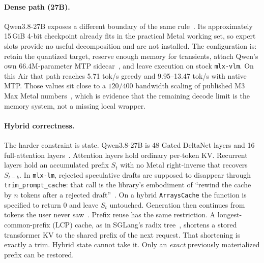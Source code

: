 \documentclass[11pt]{article}
\theoremstyle{definition}
\newcommand{\gdn}{Gated DeltaNet}
\begin{document}
\paragraph{Dense path (27B).}
Qwen3.8-27B exposes a different boundary of the same rule~\citep{qwen38card}. Its approximately 15\,GiB 4-bit checkpoint already fits in the practical Metal working set, so expert slots provide no useful decomposition and are not installed. The configuration is: retain the quantized target, reserve enough memory for transients, attach Qwen’s own 66.4M-parameter MTP sidecar~\citep{qwen3,mlxlm990}, and leave execution on stock \texttt{mlx-vlm}. On this Air that path reaches 5.71 tok/s greedy and 9.95--13.47 tok/s with native MTP. Those values sit close to a $120/400$ bandwidth scaling of published M3 Max Metal numbers~\citep{omlx2874}, which is evidence that the remaining decode limit is the memory system, not a missing local wrapper.

\paragraph{Hybrid correctness.}
The harder constraint is state. Qwen3.8-27B is 48 \gdn{} layers and 16 full-attention layers~\citep{yang2024gateddelta,qwen3}. Attention layers hold ordinary per-token KV. Recurrent layers hold an accumulated prefix $S_t$ with no Metal right-inverse that recovers $S_{t-k}$. In \texttt{mlx-lm}, rejected speculative drafts are supposed to disappear through \texttt{trim\_prompt\_cache}: that call is the library’s embodiment of ``rewind the cache by $n$ tokens after a rejected draft''~\citep{mlxlmcache,leviathan2023speculative}. On a hybrid \texttt{ArraysCache} the function is specified to return 0 and leave $S_t$ untouched. Generation then continues from tokens the user never saw~\citep{slotbankrepo}. Prefix reuse has the same restriction. A longest-common-prefix (LCP) cache, as in SGLang’s radix tree~\citep{zheng2024sglang}, shortens a stored transformer KV to the shared prefix of the next request. That shortening is exactly a trim. Hybrid state cannot take it. Only an \emph{exact} previously materialized prefix can be restored.
\end{document}
